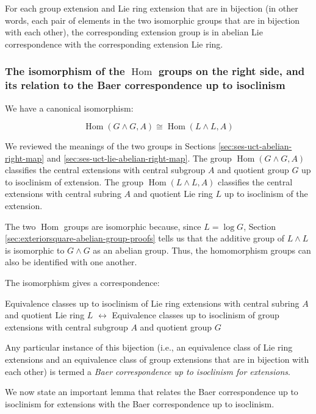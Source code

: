 \documentclass{ucetd}
\begin{document}
For each group extension and Lie ring extension that are in bijection
(in other words, each pair of elements in the two isomorphic groups
that are in bijection with each other), the corresponding extension group is in abelian
Lie correspondence with the corresponding extension Lie ring.

\subsubsection{The isomorphism of the $\operatorname{Hom}$ groups on the right side, and its relation to the Baer correspondence up to isoclinism}\label{sec:bcuti-extensions-main}

We have a canonical isomorphism:

$$\operatorname{Hom}(G \wedge G,A) \cong \operatorname{Hom}(L \wedge L, A)$$

We reviewed the meanings of the two groups in Sections
\ref{sec:ses-uct-abelian-right-map} and \ref{sec:ses-uct-lie-abelian-right-map}. The group
$\operatorname{Hom}(G \wedge G,A)$ classifies the central extensions
with central subgroup $A$ and quotient group $G$ up to isoclinism of
extension. The group $\operatorname{Hom}(L \wedge L,A)$ classifies
the central extensions with central subring $A$ and quotient Lie ring
$L$ up to isoclinism of the extension.

The two $\operatorname{Hom}$ groups are isomorphic because, since $L =
\log G$, Section \ref{sec:exteriorsquare-abelian-group-proofs} tells
us that the additive group of $L \wedge L$ is isomorphic to $G \wedge
G$ as an abelian group. Thus, the homomorphism groups can also be
identified with one another.

The isomorphism gives a correspondence:

\begin{center}
  Equivalence classes up to isoclinism of Lie ring extensions with
  central subring $A$ and quotient Lie ring $L$ $\leftrightarrow$
  Equivalence classes up to isoclinism of group extensions with central
  subgroup $A$ and quotient group $G$
\end{center}

Any particular instance of this bijection (i.e., an equivalence class
of Lie ring extensions and an equivalence class of group extensions
that are in bijection with each other) is termed a {\em Baer
  correspondence up to isoclinism for extensions}.

We now state an important lemma that relates the Baer correspondence
up to isoclinism for extensions with the Baer correspondence up to
isoclinism.
\end{document}
